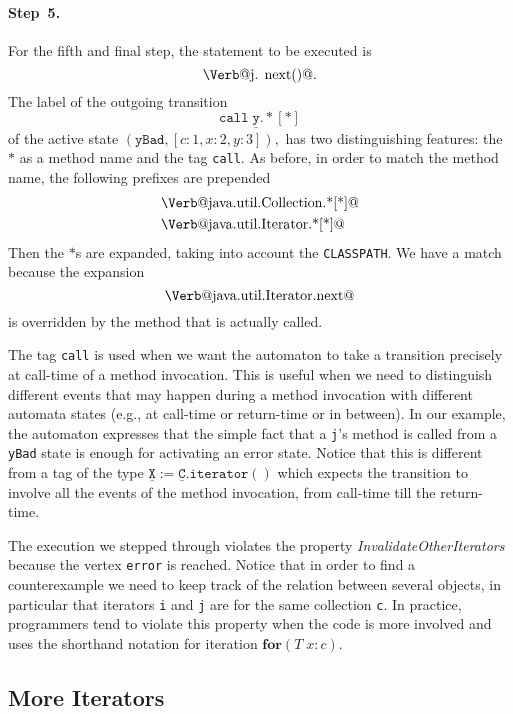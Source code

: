 \documentclass[preprint]{sigplanconf} %
\makeatletter
\newcommand{\pattern}[1]{\ensuremath{\mathtt{\underline{#1}}}}
\newcommand{\verbline}[2][]{\[\text{\Verb@#2@}#1\]}
\theoremstyle{definition}
\theoremstyle{remark}
\makeatother
\begin{document}
\paragraph{Step~5.}

For the fifth and final step, the statement to be executed is \verbline[.]{j.\PY{n+na}{next}()}
The label of the outgoing transition  \[\mathtt{call}\;\pattern{y}.{*}[*]\] of the active state $(\texttt{yBad},[c:1,x:2,y:3]),$
has two distinguishing features: the~$*$ as a method name and the tag \texttt{call}.
As before, in order to match the method name, the following prefixes are prepended  
\begin{align*}
&\text{\Verb@java.util.Collection.*[*]@} \\
&\text{\Verb@java.util.Iterator.*[*]@}
\end{align*}
Then the $*$s are expanded, taking into account the \texttt{CLASSPATH}.
We have a match because the expansion \verbline{java.util.Iterator.next} is overridden by the method that is actually called.

The tag {\tt call} is used when we want the automaton to take a transition precisely at call-time of a method invocation.
This is useful when we need to distinguish different events that may happen during a method invocation with different automata states (e.g., at call-time or return-time or in between).
In our example, the automaton expresses that the simple fact that a {\tt j}'s method is called from a {\tt yBad} state is enough for activating an error state. Notice that this is different from a tag of the type $\pattern X:=\pattern C.\mathtt{iterator}()$ which expects the transition to involve all the events of the method invocation, from call-time till the return-time.

\medskip
The execution we stepped through violates the property \textit{InvalidateOtherIterators} because the vertex \texttt{error} is reached.
Notice that in order to find a counterexample we need to keep track of the relation between several objects, in particular that iterators {\tt i} and {\tt j} are for the same collection {\tt c}.
In practice, programmers tend to violate this property when the code is more involved and uses the shorthand notation for iteration $\mathbf{for}(T\;x:c)$.

\subsection{More Iterators} \label{sec:examples.iterators} %
\end{document}
